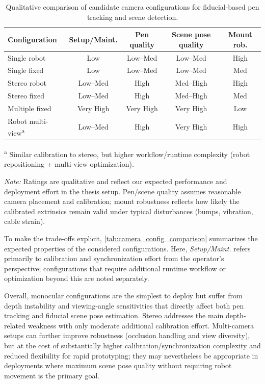 \begin{table}[t]
\centering
\caption[Comparison of candidate camera configurations]{%
Qualitative comparison of candidate camera configurations for fiducial-based pen tracking and scene detection.%
}
\label{tab:camera_config_comparison}

\small
\setlength{\tabcolsep}{4pt}
\renewcommand{\arraystretch}{1.1}
\begin{tabular}{l c c c c}
\toprule
Configuration & Setup/Maint. & Pen quality & Scene pose quality & Mount rob. \\
\midrule
Single robot & Low & Low--Med & Low--Med & High \\
Single fixed & Low & Low--Med & Low--Med & Med \\
Stereo robot & Low--Med & High & Med--High & High \\
Stereo fixed & Low--Med & High & Med--High & Med \\
Multiple fixed & Very High & Very High & Very High & Low \\
Robot multi-view\textsuperscript{a} & Low--Med & High & Very High & High \\
\bottomrule
\end{tabular}

\vspace{0.4em}
\footnotesize
\textsuperscript{a} Similar calibration to stereo, but higher workflow/runtime complexity (robot repositioning + multi-view optimization).

\emph{Note:} Ratings are qualitative and reflect our expected performance and deployment effort in the thesis setup. Pen/scene quality assumes reasonable camera placement and calibration; mount robustness reflects how likely the calibrated extrinsics remain valid under typical disturbances (bumps, vibration, cable strain).
\end{table}

To make the trade-offs explicit, \autoref{tab:camera_config_comparison} summarizes the expected properties of the considered configurations. Here, \emph{Setup/Maint.} refers primarily to calibration and synchronization effort from the operator's perspective; configurations that require additional runtime workflow or optimization beyond this are noted separately.

Overall, monocular configurations are the simplest to deploy but suffer from depth instability and viewing-angle sensitivities that directly affect both pen tracking and fiducial scene pose estimation. Stereo addresses the main depth-related weakness with only moderate additional calibration effort. Multi-camera setups can further improve robustness (occlusion handling and view diversity), but at the cost of substantially higher calibration/synchronization complexity and reduced flexibility for rapid prototyping; they may nevertheless be appropriate in deployments where maximum scene pose quality without requiring robot movement is the primary goal.

